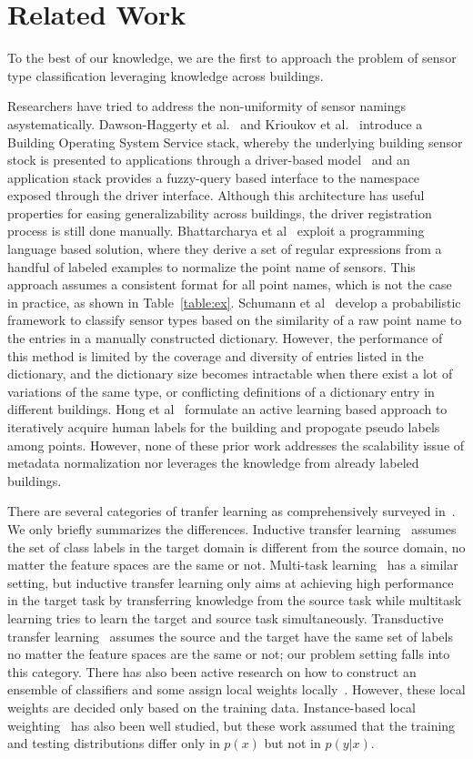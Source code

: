 \section{Related Work}
To the best of our knowledge, we are the first to approach the problem of sensor type classification leveraging knowledge across buildings.

Researchers have tried to address the non-uniformity of sensor namings asystematically.
Dawson-Haggerty et al.~\cite{boss} and Krioukov et al.~\cite{bas}
introduce a Building Operating System Service stack, whereby
the underlying building sensor stock is presented to applications through a driver-based model \
and an application stack provides a fuzzy-query based interface to the namespace exposed 
through the driver interface.
Although this architecture has useful properties for easing generalizability across
buildings, the driver registration process is still done manually. 
Bhattarcharya et al~\cite{arka} exploit a programming language based solution, 
where they derive a set of regular expressions from a handful of labeled examples 
to normalize the point name of sensors. 
This approach assumes a consistent format for all point names, which is not the case in practice, as shown in Table~\ref{table:ex}. 
Schumann et al~\cite{ibm} develop a probabilistic framework to classify sensor types 
based on the similarity of a raw point name to the entries in a manually constructed dictionary. 
However, the performance of this method is limited by the coverage and diversity of entries listed in the dictionary, and the dictionary size becomes intractable when there exist a lot of variations of the same type, or conflicting definitions of a dictionary entry in different buildings.
Hong et al~\cite{cikm} formulate an active learning based approach to iteratively 
acquire human labels for the building and propogate pseudo labels among points.
However, none of these prior work addresses the scalability issue of metadata 
normalization nor leverages the knowledge from already labeled buildings.

There are several categories of tranfer learning as comprehensively surveyed in~\cite{transfer1}. We only briefly summarizes the differences. Inductive transfer learning~\cite{transfer2} assumes the set of class labels in the target domain is different from the source domain, no matter the feature spaces are the same or not. Multi-task learning~\cite{multitask} has a similar setting, but inductive transfer learning only aims at achieving high performance in the target task by
transferring knowledge from the source task while multitask learning tries to learn the target and source task simultaneously. Transductive transfer learning~\cite{transfer3} assumes the source and the target have the same set of labels no matter the feature spaces are the same or not; our problem setting falls into this category. There has also been active research on how to construct an ensemble of classifiers and some assign local weights
locally~\cite{ensem1,ensem2}. However, these local weights are decided only based on the training data.
Instance-based local weighting~\cite{weight1,weight2,weight3} has also been well studied, but these work assumed that the training and testing distributions differ only in $p(x)$ but not in $p(y|x)$.

